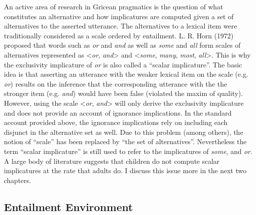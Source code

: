 \documentclass[oneside]{report}
\theoremstyle{definition}
\theoremstyle{definition}
\theoremstyle{definition}
\theoremstyle{remark}
\begin{document}
An active area of research in Gricean pragmatics is the question of what
constitutes an alternative and how implicatures are computed given a set
of alternatives to the asserted utterance. The alternatives to a lexical
item were traditionally considered as a scale ordered by entailment. L.
R. Horn (1972) proposed that words such as \emph{or} and \emph{and} as
well as \emph{some} and \emph{all} form scales of alternatives
represented as \textless{}\emph{or}, \emph{and}\textgreater{} and
\textless{}\emph{some}, \emph{many}, \emph{most},
\emph{all}\textgreater{}. This is why the exclusivity implicature of
\emph{or} is also called a ``scalar implicature''. The basic idea is
that asserting an utterance with the weaker lexical item on the scale
(e.g. \emph{or}) results on the inference that the corresponding
utterance with the the stronger item (e.g. \emph{and}) would have been
false (violated the maxim of quality). However, using the scale
\textless{}\emph{or}, \emph{and}\textgreater{} will only derive the
exclusivity implicature and does not provide an account of ignorance
implications. In the standard account provided above, the ignorance
implications rely on including each disjunct in the alternative set as
well. Due to this problem (among others), the notion of ``scale'' has
been replaced by ``the set of alternatives''. Nevertheless the term
``scalar implicature'' is still used to refer to the implicatures of
\emph{some}, and \emph{or}. A large body of literature suggests that
children do not compute scalar implicatures at the rate that adults do.
I discuss this issue more in the next two chapters.

\subsection{Entailment Environment}\label{entailment-environment}
\end{document}
